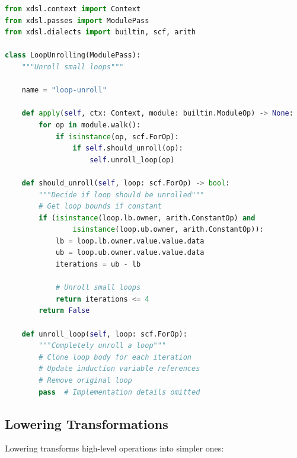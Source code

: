 \documentclass[11pt,a4paper]{article}
\begin{document}
\begin{lstlisting}[language=Python, caption=Loop Unrolling]
from xdsl.context import Context
from xdsl.passes import ModulePass
from xdsl.dialects import builtin, scf, arith

class LoopUnrolling(ModulePass):
    """Unroll small loops"""

    name = "loop-unroll"

    def apply(self, ctx: Context, module: builtin.ModuleOp) -> None:
        for op in module.walk():
            if isinstance(op, scf.ForOp):
                if self.should_unroll(op):
                    self.unroll_loop(op)
    
    def should_unroll(self, loop: scf.ForOp) -> bool:
        """Decide if loop should be unrolled"""
        # Get loop bounds if constant
        if (isinstance(loop.lb.owner, arith.ConstantOp) and
                isinstance(loop.ub.owner, arith.ConstantOp)):
            lb = loop.lb.owner.value.value.data
            ub = loop.ub.owner.value.value.data
            iterations = ub - lb

            # Unroll small loops
            return iterations <= 4
        return False
    
    def unroll_loop(self, loop: scf.ForOp):
        """Completely unroll a loop"""
        # Clone loop body for each iteration
        # Update induction variable references
        # Remove original loop
        pass  # Implementation details omitted
\end{lstlisting}

\subsection{Lowering Transformations}

Lowering transforms high-level operations into simpler ones:
\end{document}
